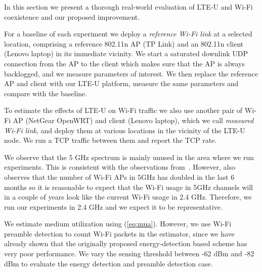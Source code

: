 In this section we present a thorough real-world evaluation of LTE-U and Wi-Fi coexistence and our proposed improvement. 



For a baseline of each experiment we deploy a {\em reference Wi-Fi link} at a selected location, comprising a reference 802.11n AP (TP Link) and an 802.11n client (Lenovo laptop) in its immediate vicinity. We start a saturated downlink UDP connection from the AP to the client which makes sure that the AP is always backlogged, and we measure parameters of interest. We then replace the reference AP and client with our LTE-U platform, measure the same parameters and compare with the baseline. 

To estimate the effects of LTE-U on Wi-Fi traffic we also use another pair of Wi-Fi AP (NetGear OpenWRT) and client (Lenovo laptop), which we call {\em measured Wi-Fi link}, and deploy them at various locations in the vicinity of the LTE-U node. We run a TCP traffic between them and report the TCP rate. 

We observe that the 5 GHz spectrum is mainly unused in the area where we run experiments. This is consistent with the observations from~\cite{meraki_sigcomm15}. However, \cite{meraki_sigcomm15} also observes that the number of Wi-Fi APs in 5GHz has doubled in the last 6 months so it is reasonable to expect that the Wi-Fi usage in 5GHz channels will in a couple of years look like the current Wi-Fi usage in 2.4 GHz. Therefore, we run our experiments in 2.4 GHz and we expect it to be representative.

We estimate medium utilization using (\ref{eq:mua}). However, we use Wi-Fi preamble detection to count Wi-Fi packets in the estimator, since we have already shown that the originally proposed energy-detection based scheme has very poor performance.
We vary the sensing threshold between -62 dBm and -82 dBm to evaluate the energy detection and preamble detection case.  





